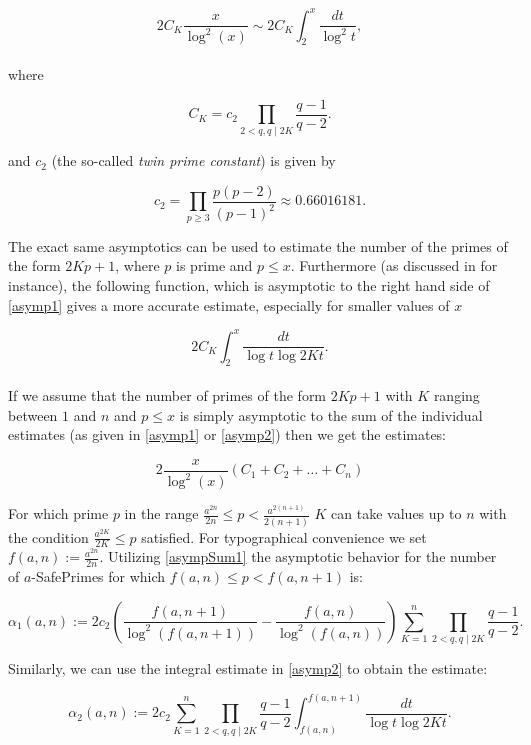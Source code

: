 \documentclass{amsart}
\numberwithin{equation}{section}
\begin{document}
\begin{equation}
	\label{asymp1}
	2C_K \frac{x}{\log^2 (x)} \sim 2C_K \int_{2}^{x} \frac{dt}{\log^2 t},
\end{equation}
\\
where

\[
\displaystyle{C_K=c_{2}\prod_{2<q, q\mid 2K}^{}\frac{q-1}{q-2}}.
\]

and $c_2$ (the so-called \emph{twin prime constant}) is given by

\[
c_2=\prod_{p\geq 3} \frac{p(p-2)}{(p-1)^2}\approx 0.66016181.
\]

The exact same asymptotics can be used to estimate  the number of the primes of the form $2Kp+1$, where $p$ is prime and $p \leq x$. Furthermore (as discussed in \cite{Chris} for instance), the following function, which is asymptotic to the right hand side of \eqref{asymp1} gives a more accurate estimate, especially for smaller values of $x$

\begin{equation}
	\label{asymp2}        
	2C_K \int_{2}^{x} \frac{dt}{\log t \log 2Kt}.
\end{equation}
\\
If we assume that the number of primes of the form $2Kp+1$ with $K$ ranging between $1$ and $n$ and $p\leq x$ is simply asymptotic to the sum of the individual estimates (as given in \eqref{asymp1} or \eqref{asymp2}) then we get the estimates:

\begin{equation}
	\label{asympSum1}
	2\frac{x}{\log^2(x)}(C_1+C_{2} +\dots+ C_{n})
\end{equation}

For which prime $p$ in the range  $\frac{a^{2n}}{2n} \leq p < \frac{a^{2(n+1)}}{2(n+1)} $ $K$ can take values up to $n$ with the condition $\frac{a^{2K}}{2K} \leq p$ satisfied. For typographical convenience we set $f(a,n):=\frac{a^{2n}}{2n}$. Utilizing \eqref{asympSum1} the asymptotic behavior for the number of $a$-SafePrimes for which $f(a,n) \leq p < f(a,n+1)$ is:

\[
\alpha_1(a,n):=2c_2\left(\frac{f(a,{n+1})}{\log^2 (f(a,n+1)) }- \frac{f(a,n)}{\log^2 (f(a,n)) } \right) \sum_{K=1}^{n} \prod_{2<q,q\mid 2K} \frac{q-1}{q-2} .
\]

Similarly, we can use the integral estimate in \eqref{asymp2} to obtain the estimate:

\[ 
\displaystyle{ \alpha_2(a,n) :=2c_2 \sum_{K=1}^{n} \prod_{2<q, q \mid 2K} \frac{q-1}{q-2} \int_{f(a,n)}^{f(a,n+1)} \frac{dt}{\log t \log 2Kt}}. 
\]
\end{document}
